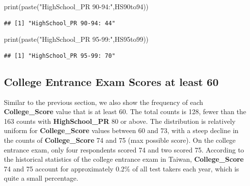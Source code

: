 \documentclass[
]{article}
\newenvironment{Shaded}{\begin{snugshade}}{\end{snugshade}}
\newcommand{\ConstantTok}[1]{\textcolor[rgb]{0.00,0.00,0.00}{#1}}
\newcommand{\FunctionTok}[1]{\textcolor[rgb]{0.00,0.00,0.00}{#1}}
\newcommand{\NormalTok}[1]{#1}
\newcommand{\OtherTok}[1]{\textcolor[rgb]{0.56,0.35,0.01}{#1}}
\newcommand{\SpecialCharTok}[1]{\textcolor[rgb]{0.00,0.00,0.00}{#1}}
\newcommand{\StringTok}[1]{\textcolor[rgb]{0.31,0.60,0.02}{#1}}
\begin{document}
\begin{Shaded}
\begin{Highlighting}[]
\FunctionTok{print}\NormalTok{(}\FunctionTok{paste}\NormalTok{(}\StringTok{"HighSchool\_PR 90{-}94:"}\NormalTok{,HS90to94))}
\end{Highlighting}
\end{Shaded}

\begin{verbatim}
## [1] "HighSchool_PR 90-94: 44"
\end{verbatim}

\begin{Shaded}
\begin{Highlighting}[]
\FunctionTok{print}\NormalTok{(}\FunctionTok{paste}\NormalTok{(}\StringTok{"HighSchool\_PR 95{-}99:"}\NormalTok{,HS95to99))}
\end{Highlighting}
\end{Shaded}

\begin{verbatim}
## [1] "HighSchool_PR 95-99: 70"
\end{verbatim}

\hypertarget{college-60-up}{%
\subsection{College Entrance Exam Scores at least
60}\label{college-60-up}}

Similar to the previous section, we also show the frequency of each
\textbf{College\_Score} value that is at least 60. The total counts is
128, fewer than the 163 counts with \textbf{HighSchool\_PR} 80 or above.
The distribution is relatively uniform for \textbf{College\_Score}
values between 60 and 73, with a steep decline in the counts of
\textbf{College\_Score} 74 and 75 (max possible score). On the college
entrance exam, only four respondents scored 74 and two scored 75.
According to the historical statistics of the college entrance exam in
Taiwan, \textbf{College\_Score} 74 and 75 account for approximately
0.2\% of all test takers each year, which is quite a small percentage.

\begin{Shaded}
\end{Shaded}
\end{document}

